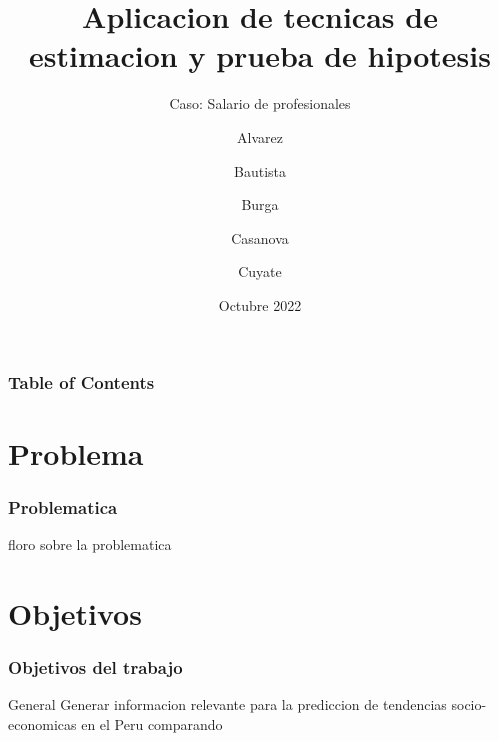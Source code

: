 \documentclass{beamer}
\title[PC1 Estadistica Aplicada] %
{Aplicacion de tecnicas de estimacion y prueba de hipotesis}
\subtitle{Caso: Salario de profesionales}
\author %
{
  Alvarez \and Bautista \and Burga \and
  Casanova \and  Cuyate
}
\institute
{
  \inst{1}%
  Facultad de Ingenieria Industrial y de Sistemas\\
  Universidad Nacional de Ingenieria
}
\date
{ Octubre 2022}
\begin{document}
\frame{\titlepage}


\begin{frame}
\frametitle{Table of Contents}
\tableofcontents
\end{frame}

\section{Problema}

\begin{frame}
\frametitle{Problematica}

floro sobre la problematica

\end{frame}



\section{Objetivos}

\begin{frame}

\frametitle{Objetivos del trabajo}

\begin{alertblock}{General}
  Generar informacion relevante para la prediccion de tendencias
  socio-economicas en el Peru comparando
\end{alertblock}
\end{frame}
\end{document}
